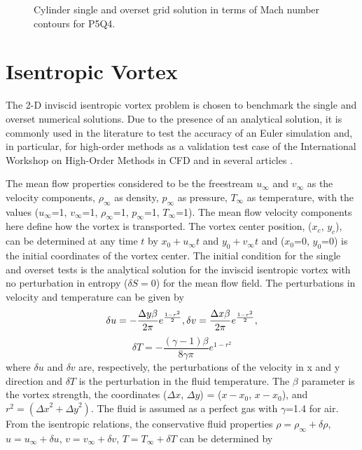 \begin{figure}[H]
{		\label{fig:ovs_mach_cyl_ho_c}
    }
    \caption{Cylinder single and overset grid solution in terms of Mach number contours for P5Q4.}
    \label{fig:mach_cylinder_ho}
\end{figure}

\section{Isentropic Vortex}

The 2-D inviscid isentropic vortex problem is chosen to benchmark the single and overset numerical solutions. Due to the presence of an analytical solution, it is commonly used in the literature to test the accuracy of an Euler simulation \cite{Yee1999} and, in particular, for high-order methods as a validation test case of the International Workshop on High-Order Methods in CFD \cite{4thHOW} and in several articles \cite{Huynh2014, Crabill2016, DuanThesis2019}.

The mean flow properties considered to be the freestream $u_{\infty}$ and $v_{\infty}$ as the velocity components, $\rho_{\infty}$ as density, $p_{\infty}$ as pressure,  $T_{\infty}$ as temperature, with the values ($u_{\infty}$=1, $v_{\infty}$=1, $\rho_{\infty}$=1, $p_{\infty}$=1, $T_{\infty}$=1). The mean flow velocity components here define how the vortex is transported. The vortex center position, ($x_c$, $y_c$), can be determined at any time $t$ by $x_0 + u_{\infty}t$ and $y_0 + v_{\infty}t$ and ($x_0$=0, $y_0$=0) is the initial coordinates of the vortex center. The initial condition for the single and overset tests is the analytical solution for the inviscid isentropic vortex with no perturbation in entropy ($\delta S=0$) for the mean flow field. The perturbations in velocity and temperature can be given by
%
\begin{equation}
    \label{eq_vortex_analytical_1}
	\delta u = 	-\frac{\Delta y \beta}{2\pi} e^{\frac{1-r^2}{2}},\\
	\delta v = 	\frac{\Delta x \beta}{2\pi} e^{\frac{1-r^2}{2}},
\end{equation}
%
\begin{equation}
    \label{eq_vortex_analytical_2}
	\delta T = 	-\frac{(\gamma-1)\beta}{8\gamma\pi} e^{1-r^2}
\end{equation}
where $\delta u$ and $\delta v$ are, respectively, the perturbations of the velocity in x and y direction and $\delta T$ is the perturbation in the fluid temperature. The $\beta$ parameter is the vortex strength, the coordinates ($\Delta x$, $\Delta y$) = ($x-x_0$, $x-x_0$), and $r^2 = ({\Delta x}^2+{\Delta y}^2)$. The fluid is assumed as a perfect gas with $\gamma$=1.4 for air. From the isentropic relations, the conservative fluid properties $\rho = \rho_{\infty} + \delta \rho$, $u = u_{\infty} + \delta u$, $v = v_{\infty} + \delta v$, $T = T_{\infty} + \delta T$ can be determined by

